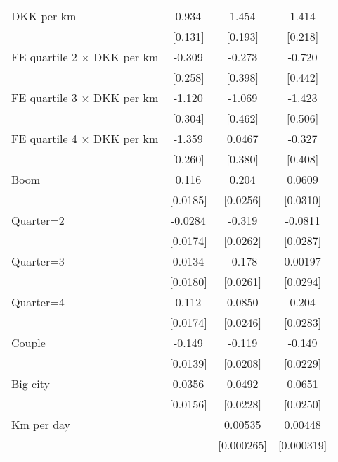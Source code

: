 \begin{longtable}{lccc}
DKK per km          &       0.934\sym{***}&       1.454\sym{***}&       1.414\sym{***}\tabularnewline
                    &     [0.131]         &     [0.193]         &     [0.218]         \tabularnewline
  
FE quartile 2 $\times$ DKK per km&      -0.309         &      -0.273         &      -0.720         \tabularnewline
                    &     [0.258]         &     [0.398]         &     [0.442]         \tabularnewline
  
FE quartile 3 $\times$ DKK per km&      -1.120\sym{***}&      -1.069\sym{*}  &      -1.423\sym{**} \tabularnewline
                    &     [0.304]         &     [0.462]         &     [0.506]         \tabularnewline
  
FE quartile 4 $\times$ DKK per km&      -1.359\sym{***}&      0.0467         &      -0.327         \tabularnewline
                    &     [0.260]         &     [0.380]         &     [0.408]         \tabularnewline
  
Boom              &       0.116\sym{***}&       0.204\sym{***}&      0.0609\sym{*}  \tabularnewline
                    &    [0.0185]         &    [0.0256]         &    [0.0310]         \tabularnewline
  
Quarter=2           &     -0.0284         &      -0.319\sym{***}&     -0.0811\sym{**} \tabularnewline
                    &    [0.0174]         &    [0.0262]         &    [0.0287]         \tabularnewline
  
Quarter=3           &      0.0134         &      -0.178\sym{***}&     0.00197         \tabularnewline
                    &    [0.0180]         &    [0.0261]         &    [0.0294]         \tabularnewline
  
Quarter=4           &       0.112\sym{***}&      0.0850\sym{***}&       0.204\sym{***}\tabularnewline
                    &    [0.0174]         &    [0.0246]         &    [0.0283]         \tabularnewline
  
Couple              &      -0.149\sym{***}&      -0.119\sym{***}&      -0.149\sym{***}\tabularnewline
                    &    [0.0139]         &    [0.0208]         &    [0.0229]         \tabularnewline
  
Big city            &      0.0356\sym{*}  &      0.0492\sym{*}  &      0.0651\sym{**} \tabularnewline
                    &    [0.0156]         &    [0.0228]         &    [0.0250]         \tabularnewline
  
Km per day          &                     &     0.00535\sym{***}&     0.00448\sym{***}\tabularnewline
                    &                     &  [0.000265]         &  [0.000319]         \tabularnewline
  

\end{longtable}

